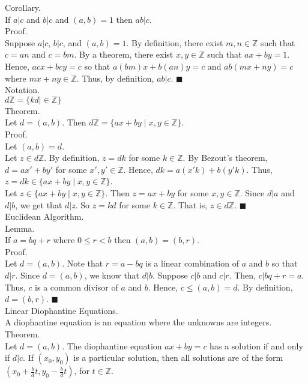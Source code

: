 \documentclass[twocolumn]{article}
\newcommand{\qed}{$\blacksquare$}
\newcommand{\integers}{\mathbb{Z}}
\begin{document}
Corollary. \\
If $a | c$ and $b | c$ and $(a, b) = 1$ then $ab | c$. \\
Proof. \\
Suppose $a | c$, $b | c$, and $(a, b) = 1$. By definition, there exist $m, n \in \integers$ such that $c = an$ and $c = bm$. By a theorem, there exist $x, y \in \integers$ such that $ax + by = 1$. Hence, $acx + bcy = c$ so that $a(bm)x + b(an)y = c$ and $ab(mx + ny) = c$ where $mx + ny \in \integers$. Thus, by definition, $ab | c$. \qed \\

Notation. \\
$d\integers = \{ kd \mid \in \integers \}$ \\

Theorem. \\
Let $d = (a, b)$. Then $d\integers = \{ ax + by \mid x, y \in \integers \}$. \\
Proof. \\
Let $(a, b) = d$. \\
Let $z \in d\integers$. By definition, $z = dk$ for some $k \in \integers$. By Bezout's theorem, $d = ax' + by'$ for some $x', y' \in \integers$. Hence, $dk = a(x'k) + b(y'k)$. Thus, $z = dk \in \{ ax + by \mid x, y \in \integers \}$. \\
Let $z \in \{ ax + by \mid x, y \in \integers \}$. Then $z = ax + by$ for some $x, y \in \integers$. Since $d | a$ and $d | b$, we get that $d | z$. So $z = kd$ for some $k \in \integers$. That is, $z \in d\integers$. \qed \\

Euclidean Algorithm. \\

Lemma. \\
If $a = bq + r$ where $0 \leq r < b$ then $(a, b) = (b, r)$. \\
Proof. \\
Let $d = (a, b)$. Note that $r = a - bq$ is a linear combination of $a$ and $b$ so that $d | r$. Since $d = (a, b)$, we know that $d | b$. Suppose $c | b$ and $c | r$. Then, $c | bq + r = a$. Thus, $c$ is a common divisor of $a$ and $b$. Hence, $c \leq (a, b) = d$. By definition, $d = (b, r)$. \qed \\

Linear Diophantine Equations. \\
A diophantine equation is an equation where the unknowns are integers. \\

Theorem. \\
Let $d = (a, b)$. The diophantine equation $ax + by = c$ has a solution if and only if $d | c$. If $(x_0, y_0)$ is a particular solution, then all solutions are of the form $\left( x_0 + \frac{b}{d}t, y_0 - \frac{b}{d}t \right)$, for $t \in \integers$. \\
\end{document}
